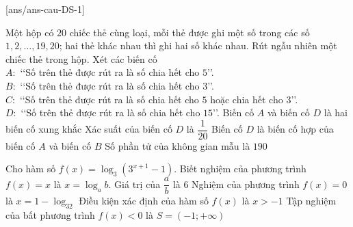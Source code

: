 \cauds
{}[ans/ans-cau-DS-1]
\begin{ex}%
	Một hộp có $20$ chiếc thẻ cùng loại, mỗi thẻ được ghi một số trong các số {$1,2,\ldots,19,20$}; hai thẻ khác nhau thì ghi hai số khác nhau. Rút ngẫu nhiên một chiếc thẻ trong hộp. Xét các biến cố\\
	\indent $A\colon$ \lq\lq Số trên thẻ được rút ra là số chia hết cho $5$\rq\rq.\\
	\indent $B\colon$ \lq\lq Số trên thẻ được rút ra là số chia hết cho $3$\rq\rq.\\
	\indent $C\colon$ \lq\lq Số trên thẻ được rút ra là số chia hết cho $5$ hoặc chia hết cho $3$\rq\rq.\\
	\indent $D\colon$ \lq\lq Số trên thẻ được rút ra là số chia hết cho $15$\rq\rq.
	\choiceTF
	{Biến cố $A$ và biến cố $D$ là hai biến cố xung khắc}
	{\True Xác suất của biến cố $D$ là $\dfrac{1}{20}$}
	{Biến cố $D$ là biến cố hợp của biến cố $A$ và biến cố $B$}
	{Số phần tử của không gian mẫu là $190$}
\end{ex}

\begin{ex}%
	Cho hàm số $f(x)=\log_3\left(3^{x+1}-1\right)$.
	\choiceTF
	{\True Biết nghiệm của phương trình $f(x)=x$ là $x=\log_ab$. Giá trị của $\dfrac{a}{b}$ là $6$}
	{Nghiệm của phương trình $f(x)=0$ là $x=1-\log_32$}
	{\True Điều kiện xác định của hàm số $f(x)$ là $x>-1$}
	{Tập nghiệm của bất phương trình $f(x)<0$ là $S=(-1;+\infty)$}
\end{ex}


